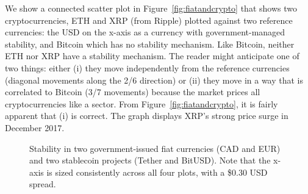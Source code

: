 We show a connected scatter plot in Figure~\ref{fig:fiatandcrypto} that shows two cryptocurrencies, ETH and XRP (from Ripple) plotted against two reference currencies: the USD on the x-axis as a currency with government-managed stability, and Bitcoin which has no stability mechanism. Like Bitcoin, neither ETH nor XRP have a stability mechanism. The reader might anticipate one of two things: either (i) they move independently from the reference currencies (diagonal movements along the 2/6 direction) or (ii) they move in a way that is correlated to Bitcoin (3/7 movements) because the market prices all cryptocurrencies like a sector. From Figure~\ref{fig:fiatandcrypto}, it is fairly apparent that (i) is correct. The graph displays XRP's strong price surge in December 2017.


\begin{figure}[t]
	\centering
	\hfill
	\hfill
	\hfill
	\caption{Stability in two government-issued fiat currencies (CAD and EUR) and two stablecoin projects (Tether and BitUSD). Note that the x-axis is sized consistently across all four plots, with a \$0.30 USD spread. }
	\label{fig:all}
\end{figure}

